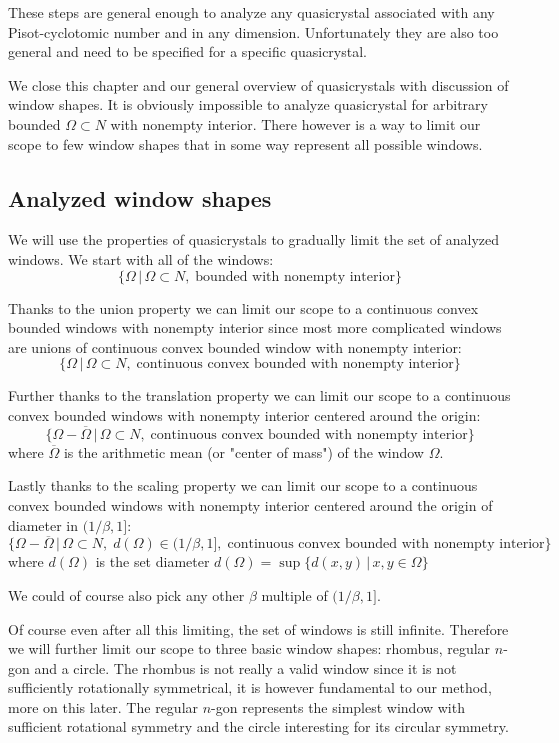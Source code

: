 \documentclass[text.tex]{subfiles}
\begin{document}
These steps are general enough to analyze any quasicrystal associated with any Pisot-cyclotomic number and in any dimension. Unfortunately they are also too general and need to be specified for a specific quasicrystal. 

We close this chapter and our general overview of quasicrystals with discussion of window shapes. It is obviously impossible to analyze quasicrystal for arbitrary bounded $\Omega\subset N$ with nonempty interior. There however is a way to limit our scope to few window shapes that in some way represent all possible windows. 

\subsection{Analyzed window shapes}
We will use the properties of quasicrystals to gradually limit the set of analyzed windows. We start with all of the windows: 
$$\big\{\Omega\,|\, \Omega\subset N ,\;\text{bounded with nonempty interior}\big\}$$

Thanks to the union property we can limit our scope to a continuous convex bounded windows with nonempty interior since most more complicated windows are unions of continuous convex bounded window with nonempty interior: 
$$\big\{\Omega\,|\, \Omega\subset N ,\;\text{continuous convex bounded with nonempty interior}\big\}$$

Further thanks to the translation property we can limit our scope to a continuous convex bounded windows with nonempty interior centered around the origin: 
$$\big\{\Omega-\overline{\Omega}\,|\, \Omega\subset N ,\;\text{continuous convex bounded with nonempty interior}\big\}$$
where $\overline{\Omega}$ is the arithmetic mean (or "center of mass") of the window $\Omega$. 

Lastly thanks to the scaling property we can limit our scope to a continuous convex bounded windows with nonempty interior centered around the origin of diameter in $(1/\beta,1]$:
$$\big\{\Omega-\overline{\Omega}\,|\, \Omega\subset N ,\; d(\Omega)\in (1/\beta,1] ,\;\text{continuous convex bounded with nonempty interior}\big\}$$
where $d(\Omega)$ is the set diameter $d(\Omega) = \sup\{d(x,y)\,|\,x,y\in\Omega\}$

\begin{remark}
We could of course also pick any other $\beta$ multiple of $(1/\beta,1]$. 
\end{remark}

Of course even after all this limiting, the set of windows is still infinite. Therefore we will further limit our scope to three basic window shapes: rhombus, regular $n$-gon and a circle. The rhombus is not really a valid window since it is not sufficiently rotationally symmetrical, it is however fundamental to our method, more on this later. The regular $n$-gon represents the simplest window with sufficient rotational symmetry and the circle interesting for its circular symmetry. 
\end{document}
